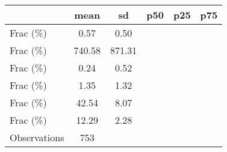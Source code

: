 {
\def\sym#1{\ifmmode^{#1}\else\(^{#1}\)\fi}
\begin{tabular}{l*{1}{ccccc}}
\toprule
                    &        mean&          sd&         p50&         p25&         p75\\
\midrule
Frac (\%)           &        0.57&        0.50&            &            &            \\
Frac (\%)           &      740.58&      871.31&            &            &            \\
Frac (\%)           &        0.24&        0.52&            &            &            \\
Frac (\%)           &        1.35&        1.32&            &            &            \\
Frac (\%)           &       42.54&        8.07&            &            &            \\
Frac (\%)           &       12.29&        2.28&            &            &            \\
\midrule
Observations        &         753&            &            &            &            \\
\bottomrule
\end{tabular}
}
